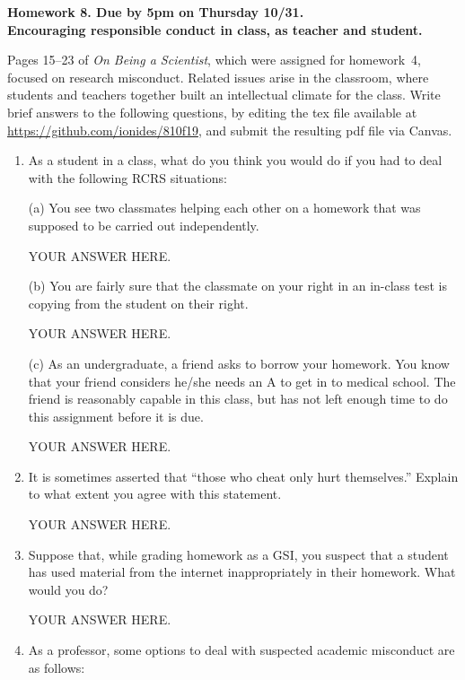 \documentclass[12pt]{article}
\begin{document}
\begin{center}\bf
Homework 8. Due by 5pm on Thursday 10/31.\\
Encouraging responsible conduct in class, as teacher and student.

\end{center}
Pages 15--23 of {\em On Being a Scientist}, which were assigned for homework~4, focused on research misconduct.  Related issues arise in the classroom, where students and teachers together built an intellectual climate for the class.  Write brief answers to the following questions, by editing the tex file available at \url{https://github.com/ionides/810f19}, and submit the resulting pdf file via Canvas.

\begin{enumerate}

\item As a student in a class, what do you think you would do if you had to deal with the following RCRS situations:

(a) You see two classmates helping each other on a homework that was supposed to be carried out independently.

YOUR ANSWER HERE.

(b) You are fairly sure that the classmate on your right in an in-class test is copying from the student on their right.

YOUR ANSWER HERE.

(c) As an undergraduate, a friend asks to borrow your homework. You know that your friend considers he/she needs an A to get in to medical school. The friend is reasonably capable in this class, but has not left enough time to do this assignment before it is due.

YOUR ANSWER HERE.

\item It is sometimes asserted that ``those who cheat only hurt themselves.'' Explain to what extent you agree with this statement.

YOUR ANSWER HERE.

\item Suppose that, while grading homework as a GSI, you suspect that a student has used material from the internet inappropriately in their homework. What would you do?

YOUR ANSWER HERE.

\item As a professor, some options to deal with suspected academic misconduct are as follows:


\end{enumerate}
\end{document}
